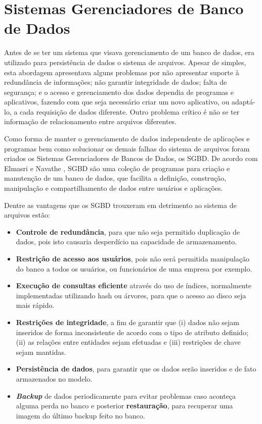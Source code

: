 \graphicspath{ {3-SGBD/} }

\chapter{Sistemas Gerenciadores de Banco de Dados}
\label{sgbd}

Antes de se ter um sistema que visava gerenciamento de um banco de dados, era utilizado para persistência de dados o sistema de arquivos. 
Apesar de simples, esta abordagem apresentava alguns problemas por não apresentar suporte à redundância de informações; não garantir integridade de dados; 
falta de segurança; e o acesso e gerenciamento dos dados dependia de programas e aplicativos, fazendo com que seja necessário criar um novo aplicativo, ou adaptá-lo, a 
cada requisição de dados diferente. Outro problema crítico é não se ter informação de relacionamento entre arquivos diferentes.

Como forma de manter o gerenciamento de dados independente de aplicações e programas bem como solucionar os demais falhas do sistema de arquivos 
foram criados os Sistemas Gerenciadores de Bancos de Dados, os SGBD.  De acordo com Elmasri e Navathe \cite{navathe2011banco}, SGBD são uma coleção de programas para 
criação e manutenção de um banco de dados, que facilita a definição, construção, manipulação e compartilhamento de dados entre usuários e aplicações.

Dentre as vantagens que os SGBD trouxeram em detrimento ao sistema de arquivos estão:

\begin{itemize}
    \item{\textbf{Controle de redundância}}, para que não seja permitido duplicação de dados, pois isto causaria desperdício na capacidade de armazenamento.
    \item{\textbf{Restrição de acesso aos usuários}}, pois não será permitida manipulação do banco a todos os usuários, ou funcionários de uma empresa por exemplo.
    \item{\textbf{Execução de consultas eficiente}} através do uso de índices, normalmente implementadas utilizando hash ou árvores, para que o acesso ao disco seja mais rápido.
    \item{\textbf{Restrições de integridade}}, a fim de garantir que (i) dados não sejam inseridos de forma inconsistente de acordo com o tipo de atributo definido; 
    (ii) as relações entre entidades sejam efetuadas e (iii) restrições de chave sejam mantidas.
    \item{\textbf{Persistência de dados}}, para garantir que os dados serão inseridos e de fato armazenados no modelo.
    \item{\textbf{\textit{Backup}}} de dados periodicamente para evitar problemas caso aconteça alguma perda no banco e posterior \textbf{restauração}, para recuperar uma imagem do último backup feito no banco.
\end{itemize}

